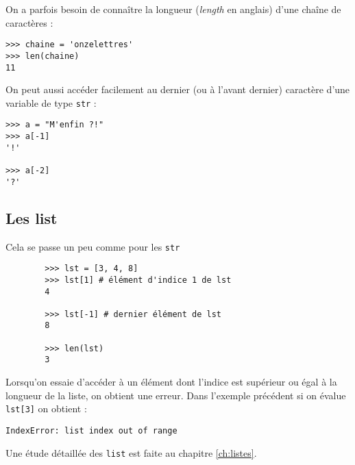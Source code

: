 On a parfois besoin de connaître la longueur (\emph{length} en anglais) d'une chaîne de caractères :

\begin{pyc}\begin{verbatim}
>>> chaine = 'onzelettres'
>>> len(chaine)
11
\end{verbatim}
\end{pyc}

On peut aussi accéder facilement au dernier (ou à l'avant dernier) caractère d'une variable de type \texttt{str} :

\begin{pyc}
	\begin{verbatim}
>>> a = "M'enfin ?!"
>>> a[-1]
'!'

>>> a[-2]
'?'
\end{verbatim}
\end{pyc}

\subsection{Les list}

Cela se passe un peu comme pour les \texttt{str}

\begin{pyc}
	\begin{verbatim}
		>>> lst = [3, 4, 8]
		>>> lst[1] # élément d'indice 1 de lst
		4

		>>> lst[-1] # dernier élément de lst
		8

		>>> len(lst)
		3
	\end{verbatim}
\end{pyc}

Lorsqu'on essaie d'accéder à un élément dont l'indice est supérieur ou égal à la longueur de la liste, on obtient une erreur. Dans l'exemple précédent si on évalue \texttt{lst[3]} on obtient :
\color{UGLiRed}
\begin{verbatim}
IndexError: list index out of range	
\end{verbatim}
\color{black}

Une étude détaillée des \texttt{list} est faite au chapitre \ref{ch:listes}.

